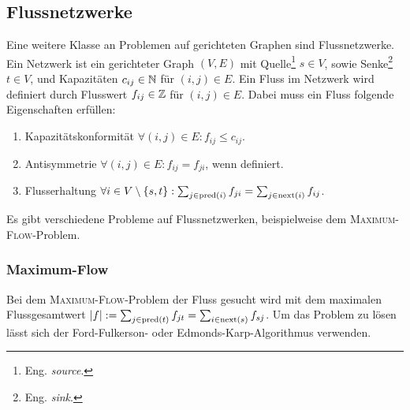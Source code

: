 \subsection{Flussnetzwerke}
Eine weitere Klasse an Problemen auf gerichteten Graphen sind Flussnetzwerke.
Ein Netzwerk ist ein gerichteter Graph \((V, E)\) mit Quelle\footnote{Eng. \emph{source}.} \(s \in V\), sowie Senke\footnote{Eng. \emph{sink}.} \(t \in V\), und Kapazitäten \(c_{ij} \in \mathbb N\) für \((i,j) \in E\).
Ein Fluss im Netzwerk wird definiert durch Flusswert \(f_{ij} \in \mathbb Z\) für \((i,j) \in E\).
Dabei muss ein Fluss folgende Eigenschaften erfüllen:
\begin{enumerate}
    \item Kapazitätskonformität \(\forall (i, j) \in E: f_{ij} \le c_{ij}\).
    \item Antisymmetrie \(\forall (i, j) \in E: f_{ij} = f_{ji}\), wenn definiert.
    \item Flusserhaltung \(\forall i \in V \setminus \{s, t\}: \sum_{j\in \text{pred}(i)} f_{ji} = \sum_{j \in \text{next}(i)} f_{ij}\).
\end{enumerate}

Es gibt verschiedene Probleme auf Flussnetzwerken, beispielweise dem \textsc{Maximum-Flow}-Problem.
\subsubsection{Maximum-Flow}
Bei dem \textsc{Maximum-Flow}-Problem der Fluss gesucht wird mit dem maximalen Flussgesamtwert \(|f| := \sum_{j \in \text{pred}(t)}f_{jt} = \sum_{i \in \text{next}(s)}f_{sj}\).
Um das Problem zu lösen lässt sich der Ford-Fulkerson- oder Edmonds-Karp-Algorithmus verwenden.


